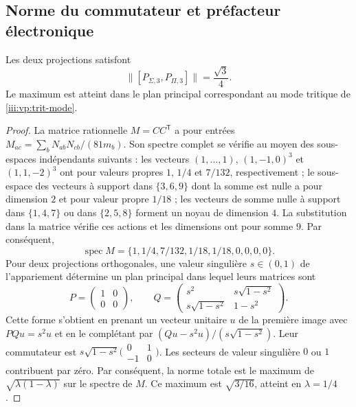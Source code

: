 \subsection{Norme du commutateur et préfacteur électronique}

\begin{theorem}
Les deux projections satisfont
\begin{equation}
 \bigl\|[P_{\Sigma,3},P_{\Pi,3}]\bigr\|=\frac{\sqrt3}{4}.
 \label{iii:vp:prefactor}
\end{equation}
Le maximum est atteint dans le plan principal correspondant au mode
tritique de \eqref{iii:vp:trit-mode}.
\end{theorem}
\begin{proof}
La matrice rationnelle $M=CC^{\mathsf T}$ a pour entrées $M_{ac}=\sum_bN_{ab}N_{cb}/(81m_b)$. Son spectre complet se vérifie au moyen des sous-espaces indépendants suivants : les vecteurs $(1,\ldots,1)$, $(1,-1,0)^3$ et $(1,1,-2)^3$ ont pour valeurs propres $1$, $1/4$ et $7/132$, respectivement ; le sous-espace des vecteurs à support dans $\{3,6,9\}$ dont la somme est nulle a pour dimension $2$ et pour valeur propre $1/18$ ; les vecteurs de somme nulle à support dans $\{1,4,7\}$ ou dans $\{2,5,8\}$ forment un noyau de dimension $4$. La substitution dans la matrice vérifie ces actions et les dimensions ont pour somme $9$. Par conséquent,
\[
 \operatorname{spec}M=
 \{1,1/4,7/132,1/18,1/18,0,0,0,0\}.
\]
Pour deux projections orthogonales, une valeur singulière $s\in(0,1)$ de
l’appariement détermine un plan principal dans lequel leurs matrices sont
\[
 P=\begin{pmatrix}1&0\\0&0\end{pmatrix},\qquad
 Q=\begin{pmatrix}s^2&s\sqrt{1-s^2}\\
 s\sqrt{1-s^2}&1-s^2\end{pmatrix}.
\]
Cette forme s’obtient en prenant un vecteur unitaire $u$ de la première
image avec $PQu=s^2u$ et en le complétant par
$(Qu-s^2u)/(s\sqrt{1-s^2})$. Leur commutateur est
$s\sqrt{1-s^2}\bigl(\begin{smallmatrix}0&1\\-1&0\end{smallmatrix}\bigr)$.
Les secteurs de valeur singulière $0$ ou $1$ contribuent par zéro.
Par conséquent, la norme totale est le maximum de
$\sqrt{\lambda(1-\lambda)}$ sur le spectre de $M$. Ce maximum
est $\sqrt{3/16}$, atteint en $\lambda=1/4$.
\end{proof}

